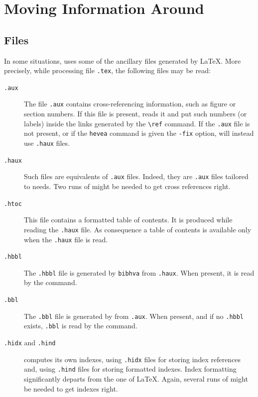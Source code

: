 \section{Moving Information Around}

\subsection{\label{files}Files}
In some situations,
\hevea{} uses some of the ancillary files generated by \LaTeX.
More precisely, while processing file \texttt{.tex},
the following files may be read:
\begin{description}
\item[\protect\texttt{.aux}] The file \texttt{.aux} contains
cross-referencing information, such as figure or section numbers.
If this file is present, \hevea{} reads it and put such numbers (or
labels) inside
the links generated by the \verb+\ref+ command. If the \texttt{.aux}
file is not present, or if the \texttt{hevea} command is given the
\texttt{-fix} option, \hevea{} will instead use \texttt{.haux}
files.
\item[\protect\texttt{.haux}] Such files are \hevea{} equivalents of
\texttt{.aux} files. Indeed, they are \texttt{.aux} files tailored to
\hevea{} needs.
Two runs of \hevea{} might be needed to get cross references right.
\item[\protect\texttt{.htoc}] This file contains a formatted table of
contents. It is produced while reading the \texttt{.haux} file.
As consequence a table of contents is available only when the
\texttt{.haux} file is read.


\item[\protect\texttt{.hbbl}] The \texttt{.hbbl} file
is generated by \texttt{bibhva} from \texttt{.haux}.
When present, it is read by the \verb++ command.

\item[\protect\texttt{.bbl}] The \texttt{.bbl} file is
generated by \BibTeX{} from \texttt{.aux}.
When present, and if no \texttt{.hbbl} exists,
\texttt{.bbl} is read by the \verb++ command.

\item[\protect\texttt{.hidx} and \protect\texttt{.hind}]
\hevea{} computes its own indexes, using \texttt{.hidx} files for
storing index references and, using \texttt{.hind} files
for storing formatted indexes.
Index formatting significantly departs from the one of \LaTeX{}.
Again, several runs of \hevea{} might be needed to get indexes right.
\end{description}

